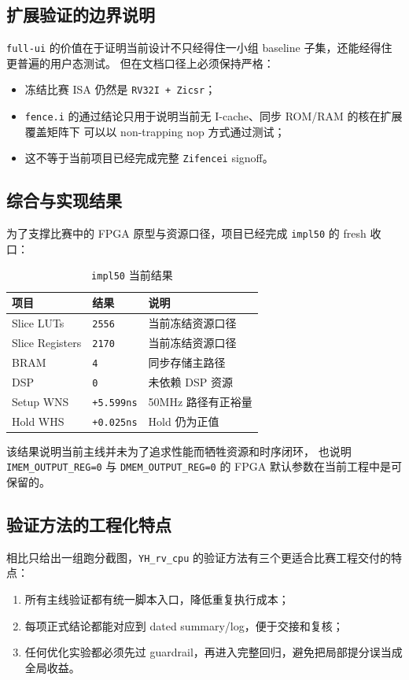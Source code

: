 \subsection{扩展验证的边界说明}

\texttt{full-ui} 的价值在于证明当前设计不只经得住一小组 baseline 子集，还能经得住更普遍的用户态测试。
但在文档口径上必须保持严格：

\begin{itemize}
    \item 冻结比赛 ISA 仍然是 \texttt{RV32I + Zicsr}；
    \item \texttt{fence.i} 的通过结论只用于说明当前无 I-cache、同步 ROM/RAM 的核在扩展覆盖矩阵下
    可以以 non-trapping nop 方式通过测试；
    \item 这不等于当前项目已经完成完整 \texttt{Zifencei} signoff。
\end{itemize}

\subsection{综合与实现结果}

为了支撑比赛中的 FPGA 原型与资源口径，项目已经完成 \texttt{impl50} 的 fresh 收口：

\begin{table}[H]
    \centering
    \caption{\texttt{impl50} 当前结果}
    \begin{tabular}{p{} p{} p{}}
        \toprule
        项目 & 结果 & 说明 \\
        \midrule
        Slice LUTs & \texttt{2556} & 当前冻结资源口径 \\
        Slice Registers & \texttt{2170} & 当前冻结资源口径 \\
        BRAM & \texttt{4} & 同步存储主路径 \\
        DSP & \texttt{0} & 未依赖 DSP 资源 \\
        Setup WNS & \texttt{+5.599ns} & 50MHz 路径有正裕量 \\
        Hold WHS & \texttt{+0.025ns} & Hold 仍为正值 \\
        \bottomrule
    \end{tabular}
\end{table}

该结果说明当前主线并未为了追求性能而牺牲资源和时序闭环，
也说明 \texttt{IMEM\_OUTPUT\_REG=0} 与 \texttt{DMEM\_OUTPUT\_REG=0}
 的 FPGA 默认参数在当前工程中是可保留的。

\subsection{验证方法的工程化特点}

相比只给出一组跑分截图，\texttt{YH\_rv\_cpu} 的验证方法有三个更适合比赛工程交付的特点：

\begin{enumerate}
    \item 所有主线验证都有统一脚本入口，降低重复执行成本；
    \item 每项正式结论都能对应到 dated summary/log，便于交接和复核；
    \item 任何优化实验都必须先过 guardrail，再进入完整回归，避免把局部提分误当成全局收益。
\end{enumerate}


\clearpage
